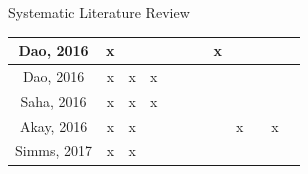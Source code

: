 \documentclass[aspectratio=169,10pt,xcolor={dvipsnames}]{beamer}
\begin{document}
\begin{frame}{Systematic Literature Review}
\begin{table}[]
{\begin{tabular}{c|c|c|c|c|c|c|ccc|c|c}
    Dao, 2016                               & x                                                               &                   &                &                &                                                                     &                       & \multicolumn{1}{c|}{x}                 & \multicolumn{1}{c|}{}                                                               &               &                                                                  &                                                                         \\ \hline
    Dao, 2016                               & x                                                               & x                 & x              &                &                                                                     &                       & \multicolumn{1}{c|}{}                  & \multicolumn{1}{c|}{}                                                               &               &                                                                  &                                                                         \\ \hline
    Saha, 2016 \cite{saha_framework_2016}                         & x                                                               & x                 & x              &                &                                                                     &                       & \multicolumn{1}{c|}{}                  & \multicolumn{1}{c|}{}                                                               &               &                                                                  &                                                                         \\ \hline
    Akay, 2016 \cite{akay_assessing_2016}                         & x                                                               & x                 &                &                &                                                                     &                       & \multicolumn{1}{c|}{}                  & \multicolumn{1}{c|}{x}                                                              &               & x                                                                &                                                                         \\ \hline
    Simms, 2017 \cite{simms_detecting_2017}                       & x                                                               & x                 &                &                &                                                                     &                       & \multicolumn{1}{c|}{}                  & \multicolumn{1}{c|}{}                                                               &               &                                                                  &                                                                         \\ \hline

\end{tabular}}
\end{table}
\end{frame}
\end{document}
